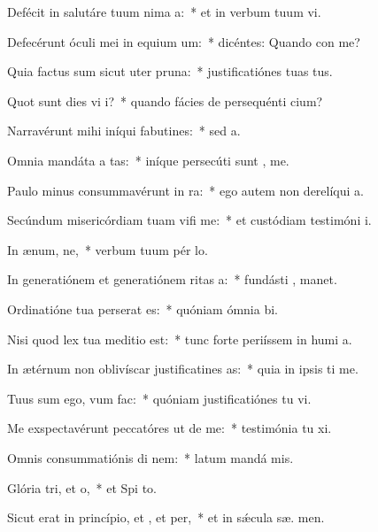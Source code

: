 \item Defécit in salutáre tuum nima a:~* et in verbum tuum vi.
\item Defecérunt óculi mei in equium um:~* dicéntes: Quando con me?
\item Quia factus sum sicut uter  pruna:~* justificatiónes tuas   tus.
\item Quot sunt dies vi i?~* quando fácies de persequénti  cium?
\item Narravérunt mihi iníqui fabutines:~* sed    a.
\item Omnia mandáta a tas:~* iníque persecúti sunt ,  me.
\item Paulo minus consummavérunt  in ra:~* ego autem non derelíqui  a.
\item Secúndum misericórdiam tuam vifi me:~* et custódiam testimóni  i.
\item In ænum, ne,~* verbum tuum pér  lo.
\item In generatiónem et generatiónem ritas a:~* fundásti ,  manet.
\item Ordinatióne tua perserat es:~* quóniam ómnia  bi.
\item Nisi quod lex tua meditio  est:~* tunc forte periíssem in humi a.
\item In ætérnum non oblivíscar justificatines as:~* quia in ipsis ti me.
\item Tuus sum ego, vum  fac:~* quóniam justificatiónes tu vi.
\item Me exspectavérunt peccatóres ut de me:~* testimónia tu xi.
\item Omnis consummatiónis di nem:~* latum mandá  mis.
\item Glória tri, et o,~* et Spi to.
\item Sicut erat in princípio, et , et per,~* et in sǽcula sæ. men.
